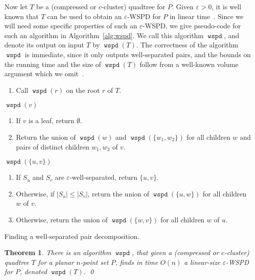 \documentclass[11pt]{paper}
\newcommand {\eps} {\varepsilon}
\DeclareMathOperator {\wspd}{\texttt{wspd}}
\newtheorem {theorem} {Theorem}[section]
\begin{document}
    Now let  $T$ be a (compressed or $c$-cluster) quadtree for $P$.
    Given $\eps > 0$, it is well known that $T$ can be used to
    obtain an $\eps$-WSPD for $P$ in linear time~\cite{CallahanKo95,HarPeled11}.
    Since we will need some specific properties of such an $\eps$-WSPD,
    we give pseudo-code for such an  algorithm 
    in Algorithm~\ref{alg:wspd}. We call this algorithm
    $\wspd$, and denote its output on input $T$ by $\wspd(T)$.
    The correctness of the algorithm $\wspd$ is immediate,
    since it only outputs well-separated pairs, and the bounds on the
    running time and the size of $\wspd(T)$ follow from a well-known
    volume argument which we
    omit~\cite{BuchinLoMoMuXX,CallahanKo95,Chan08,HarPeled11}.
   \begin{algorithm}[ht]
    \begin{enumerate}
    \item Call $\wspd(r)$ on the root $r$ of $T$.
    \end{enumerate}
    $\wspd(v)$
    \begin{enumerate}
    \item If $v$ is a leaf, return $\emptyset$.
    \item Return the union of $\wspd(w)$ and
      $\wspd(\{w_1, w_2\})$ for all children $w$ and
      pairs of distinct children $w_1, w_2$ of $v$.
    \end{enumerate}
    \vskip0.2cm
    \noindent
    $\wspd(\{u, v\})$
    \begin{enumerate}
    \item If $S_{u}$ and $S_{v}$ are
    $\eps$-well-separated, return $\{u, v\}$.
    \item Otherwise, if $|S_u|\leq |S_{v}|$, return
       the union of $\wspd(\{u, w\})$ for all children $w$ of $v$.
    \item  Otherwise, return the union of $\wspd(\{w, v\})$ for all
       children $w$ of $u$.
    \end{enumerate}
    \caption{Finding a well-separated pair decomposition.}
    \label{alg:wspd}
    \end{algorithm}


    \begin{theorem}\label{thm:wspd}
       There is an algorithm \emph{$\wspd$}, that given a 
       (compressed or $c$-cluster) 
       quadtree $T$ for a planar $n$-point set $P$, finds in time $O(n)$
       a linear-size $\eps$-WSPD for $P$, denoted \emph{$\wspd(T)$}.
       \qed
    \end{theorem}
\end{document}

